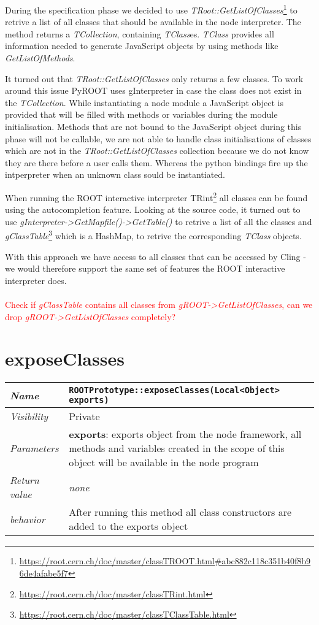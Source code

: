 During the specification phase we decided to use \textit{TRoot::GetListOfClasses}\footnote{\url{https://root.cern.ch/doc/master/classTROOT.html\#abc882c118c351b40f8b96de4afabe5f7}} to retrive a list of all classes that should be available in the node interpreter.
The method returns a \textit{TCollection}, containing \textit{TClass}es.
\textit{TClass} provides all information needed to generate JavaScript objects by using methods like \textit{GetListOfMethods}.

It turned out that \textit{TRoot::GetListOfClasses} only returns a few classes.
To work around this issue PyROOT uses gInterpreter in case the class does not exist in the \textit{TCollection}.
While instantiating a node module a JavaScript object is provided that will be filled with methods or variables during the module initialisation.
Methods that are not bound to the JavaScript object during this phase will not be callable, we are not able to handle class initialisations of classes which are not in the \textit{TRoot::GetListOfClasses} collection because we do not know they are there before a user calls them.
Whereas the python bindings fire up the intperpreter when an unknown class sould be instantiated.

When running the ROOT interactive interpreter TRint\footnote{\url{https://root.cern.ch/doc/master/classTRint.html}} all classes can be found using the autocompletion feature.
Looking at the source code, it turned out to use \textit{gInterpreter-\textgreater GetMapfile()-\textgreater GetTable()} to retrive a list of all the classes and \textit{gClassTable}\footnote{\url{https://root.cern.ch/doc/master/classTClassTable.html}} which is a HashMap, to retrive the corresponding \textit{TClass} objects.

With this approach we have access to all classes that can be accessed by Cling - we would therefore support the same set of features the ROOT interactive interpreter does.
\\
\\
\textcolor{red}{Check if \textit{gClassTable} contains all classes from \textit{gROOT-\textgreater GetListOfClasses}, can we drop \textit{gROOT-\textgreater GetListOfClasses} completely?}
\newpage
\section{exposeClasses}
\begin{longtable}{p{3cm} @{\hskip 1cm} p{12cm}}
  \hline
  \textit{Name} & \texttt{ROOTPrototype::exposeClasses(Local<Object> exports)} \\
  \hline
  \textit{Visibility} & Private \\
  \hline
  \textit{Parameters} & \textbf{exports}: exports object from the node framework, all methods and variables created in the scope of this object will be available in the node program \\
  \hline
  \textit{Return value} & \textit{none} \\
  \hline
  \textit{behavior} & After running this method all class constructors are added to the exports object \\
  \hline
\end{longtable}


